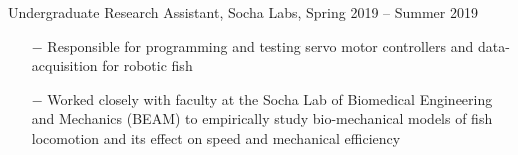 \documentclass{article}
\begin{document}
{%

{\selectfont Undergraduate Research Assistant, Socha Labs, Spring 2019 – Summer 2019}
\vspace{-5pt}
\begin{itemize}
	\setlength{\leftskip}{15pt}
	\setlength\itemsep{-0.5em}
	\item[$-$] Responsible for programming and testing servo motor controllers and data-acquisition for robotic fish
	\item[$-$] Worked closely with faculty at the Socha Lab of Biomedical Engineering and Mechanics (BEAM) to empirically study bio-mechanical models of fish locomotion and its effect on speed and mechanical efficiency
\end{itemize}



% 
% 
% 

}
\end{document}
